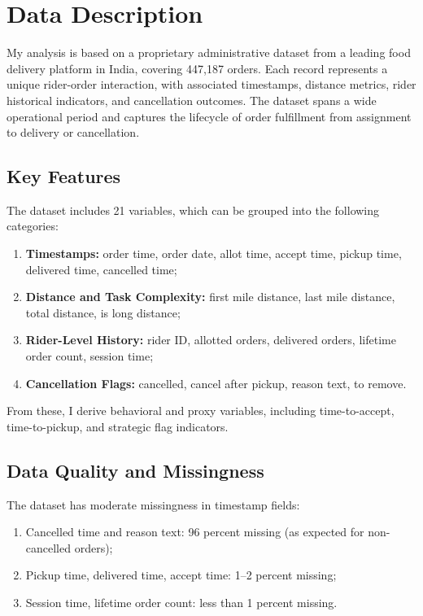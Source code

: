 \section{Data Description}

My analysis is based on a proprietary administrative dataset from a leading food delivery platform in India, covering 447,187 orders. Each record represents a unique rider-order interaction, with associated timestamps, distance metrics, rider historical indicators, and cancellation outcomes. The dataset spans a wide operational period and captures the lifecycle of order fulfillment from assignment to delivery or cancellation.

\subsection{Key Features}

The dataset includes 21 variables, which can be grouped into the following categories:
\begin{enumerate}
    \item \textbf{Timestamps:} order time, order date, allot time, accept time, pickup time, delivered time, cancelled time;
    \item \textbf{Distance and Task Complexity:} first mile distance, last mile distance, total distance, is long distance;
    \item \textbf{Rider-Level History:} rider ID, allotted orders, delivered orders, lifetime order count, session time;
    \item \textbf{Cancellation Flags:} cancelled, cancel after pickup, reason text, to remove.
\end{enumerate}

From these, I derive behavioral and proxy variables, including time-to-accept, time-to-pickup, and strategic flag indicators.

\subsection{Data Quality and Missingness}

The dataset has moderate missingness in timestamp fields:
\begin{enumerate}
    \item Cancelled time and reason text: 96 percent missing (as expected for non-cancelled orders);
    \item Pickup time, delivered time, accept time: 1--2 percent missing;
    \item Session time, lifetime order count: less than 1 percent missing.
\end{enumerate}

